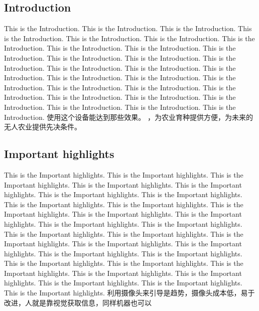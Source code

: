 \documentclass[12pt]{article}
\begin{document}
\begin{flushleft}
\subsection{Introduction}
This is the Introduction. This is the Introduction. This is the Introduction. This is the Introduction. This is the Introduction. This is the Introduction. This is the Introduction. This is the Introduction. This is the Introduction. This is the Introduction. This is the Introduction. This is the Introduction. This is the Introduction. This is the Introduction. This is the Introduction. This is the Introduction. This is the Introduction. This is the Introduction. This is the Introduction. This is the Introduction. This is the Introduction. This is the Introduction. This is the Introduction. This is the Introduction. This is the Introduction. This is the Introduction. This is the Introduction. This is the Introduction. 
使用这个设备能达到那些效果。
，为农业育种提供方便，为未来的无人农业提供先决条件。

\subsection{Important highlights}
This is the Important highlights. This is the Important highlights. This is the Important highlights. This is the Important highlights. This is the Important highlights. This is the Important highlights. This is the Important highlights. This is the Important highlights. This is the Important highlights. This is the Important highlights. This is the Important highlights. This is the Important highlights. This is the Important highlights. This is the Important highlights. This is the Important highlights. This is the Important highlights. This is the Important highlights. This is the Important highlights. This is the Important highlights. This is the Important highlights. This is the Important highlights. This is the Important highlights. This is the Important highlights. This is the Important highlights. This is the Important highlights. This is the Important highlights. This is the Important highlights. This is the Important highlights. This is the Important highlights. 
利用摄像头来引导是趋势，摄像头成本低，易于改进，人就是靠视觉获取信息，同样机器也可以


\end{flushleft}
\end{document}
